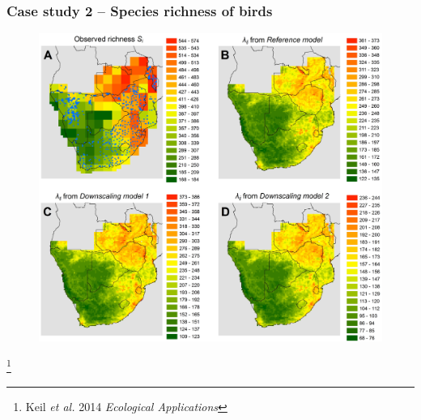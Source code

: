 \documentclass[xcolor=x11names, compress]{beamer}
\renewcommand{\(}{\begin{columns}}
\renewcommand{\)}{\end{columns}}
\newcommand{\<}[1]{\begin{column}{#1}}
\renewcommand{\>}{\end{column}}
\begin{document}

\begin{frame}
\frametitle{Case study 2 -- Species richness of birds}
\begin{figure}
	\includegraphics[width=0.7\linewidth]{fig/afr_coarse.png}
\end{figure}
\let\thefootnote\relax\footnote{Keil \textit{et al.} 2014 \textit{Ecological Applications}}
\end{frame}
\end{document}
